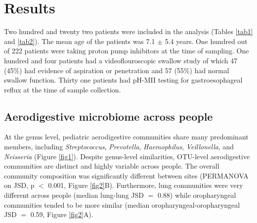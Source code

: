 \section{Results}

Two hundred and twenty two patients were included in the analysis (Tables \ref{tab1} and \ref{tab2}).
The mean age of the patients was 7.1 $\pm$ 5.4 years.
One hundred out of 222 patients were taking proton pump inhibitors at the time of sampling.
One hundred and four patients had a videoflouroscopic swallow study of which 47 (45\%) had evidence of aspiration or penetration and 57 (55\%) had normal swallow function.
Thirty one patients had pH-MII testing for gastroesophageal reflux at the time of sample collection.

\subsection{Aerodigestive microbiome across people}

At the genus level, pediatric aerodigestive communities share many predominant members, including \textit{Streptococcus}, \textit{Prevotella}, \textit{Haemophilus}, \textit{Veillonella}, and \textit{Neisseria} (Figure \ref{fig1}).
Despite genus-level similarities, OTU-level aerodigestive communities are distinct and highly variable across people.
The overall community composition was significantly different between sites (PERMANOVA on JSD, p $<$ 0.001, Figure \ref{fig2}B).
Furthermore, lung communities were very different across people (median lung-lung JSD $=$ 0.88) while oropharyngeal communities tended to be more similar (median oropharyngeal-oropharyngeal JSD $=$ 0.59, Figure \ref{fig2}A).



